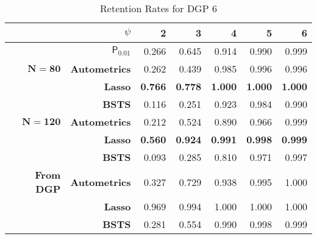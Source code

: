 \begin{table}[htbp]
  \centering

    \begin{tabular}{r|r|rrrrr}

          & \boldmath{}\textbf{$\psi$}\unboldmath{} & 2    & 3     & 4    & 5     & 6 \\
          \hline

          & $\mathsf{P}_{0.01}$ & 0.266 & 0.645 & 0.914 & 0.990 & 0.999  \\
          \hline
    $\bm{N=80}$ & \textbf{Autometrics} & 0.262 & 0.439 & 0.985 & 0.996 & 0.996 \\
    \textbf{} & \textbf{Lasso} & \textbf{0.766} & \textbf{0.778} & \textbf{1.000} & \textbf{1.000} & \textbf{1.000} \\
    \textbf{} & \textbf{BSTS} & 0.116 & 0.251 & 0.923 & 0.984 & 0.990 \\
    \hline
    $\bm{N=120}$ & \textbf{Autometrics} & 0.212 & 0.524 & 0.890 & 0.966 & 0.999 \\
    \textbf{} & \textbf{Lasso} & \textbf{0.560} & \textbf{0.924} & \textbf{0.991} & \textbf{0.998} & \textbf{0.999} \\
    \textbf{} & \textbf{BSTS} & 0.093 & 0.285 & 0.810 & 0.971 & 0.997 \\
    \hline
    \textbf{From DGP} & \textbf{Autometrics} & 0.327 & 0.729 & 0.938 & 0.995 & 1.000 \\
          & \textbf{Lasso} & 0.969 & 0.994 & 1.000 & 1.000 & 1.000 \\
          & \textbf{BSTS} & 0.281 & 0.554 & 0.990 & 0.998 & 0.999 \\

    \end{tabular}%
      \caption{Retention Rates for DGP 6}
  \label{DGP6RetRates}%
\end{table}%


